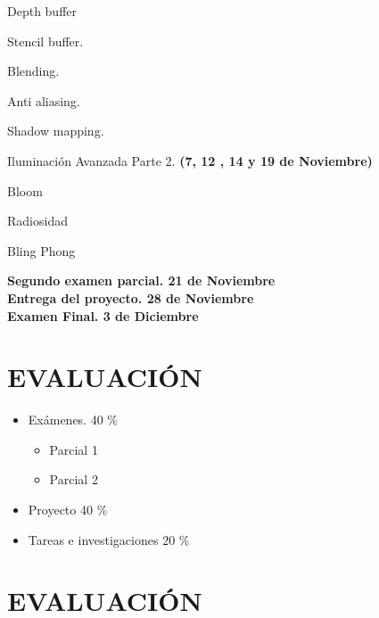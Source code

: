 \documentclass[a4paper,11pt]{article}
\theoremstyle{mytheor}
\begin{document}
\begin{legal}
	\begin{legal}
		\item Depth buffer
		\item Stencil buffer.
		\item Blending.
		\item Anti aliasing.
	\end{legal}
	\item Shadow mapping.
	\item Iluminación Avanzada Parte 2. \textbf{(7, 12 , 14 y 19 de Noviembre)}
	\begin{legal}
		\item Bloom
		\item Radiosidad
		\item Bling Phong
	\end{legal}
	\textbf{Segundo examen parcial. 21 de Noviembre}
	\\ \textbf{Entrega del proyecto. 28 de Noviembre }
	\\ \textbf{Examen Final. 3 de Diciembre}
	
\end{legal}

\section*{EVALUACIÓN}

\begin{itemize}
	\item Exámenes.	40 \%
	\begin{itemize}
		\item Parcial 1
		\item Parcial 2
	\end{itemize}
	\item Proyecto 40 \%
	\item Tareas e investigaciones 20 \%
\end{itemize}

\section*{EVALUACIÓN}
\end{document}
